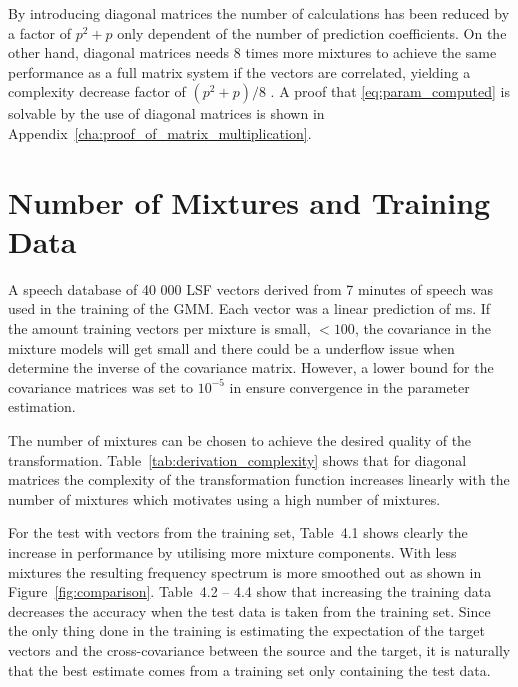 By introducing diagonal matrices the number of calculations has been reduced by a factor of $p^2+p$ only dependent of the number of prediction coefficients. On the other hand, diagonal matrices needs 8 times more mixtures to achieve the same performance as a full matrix system if the vectors are correlated, yielding a complexity decrease factor of $(p^2+p)/8$ \cite{stylianou98}. A proof that \eqref{eq:param_computed} is solvable by the use of diagonal matrices is shown in Appendix~\ref{cha:proof_of_matrix_multiplication}. 


\section{Number of Mixtures and Training Data} %
\label{sec:number_of_mixture}
A speech database of 40 000 LSF vectors derived from 7 minutes of speech was used in the training of the GMM. Each vector was a linear prediction of  ms. If the amount training vectors per mixture is small, \eg $<100$, the covariance in the mixture models will get small and there could be a underflow issue when determine the inverse of the covariance matrix. However, a lower bound for the covariance matrices was set to $10^{-5}$ in ensure convergence in the parameter estimation.

The number of mixtures can be chosen to achieve the desired quality of the transformation. Table~\ref{tab:derivation_complexity} shows that for diagonal matrices the complexity of the transformation function increases linearly with the number of mixtures which motivates using a high number of mixtures.

For the test with vectors from the training set, Table~4.1 shows clearly the increase in performance by utilising more mixture components. With less mixtures the resulting frequency spectrum is more smoothed out as shown in Figure~\ref{fig:comparison}. Table~4.2 -- 4.4 show that increasing the training data decreases the accuracy when the test data is taken from the training set. Since the only thing done in the training is estimating the expectation of the target vectors and the cross-covariance between the source and the target, it is naturally that the best estimate comes from a training set only containing the test data.

